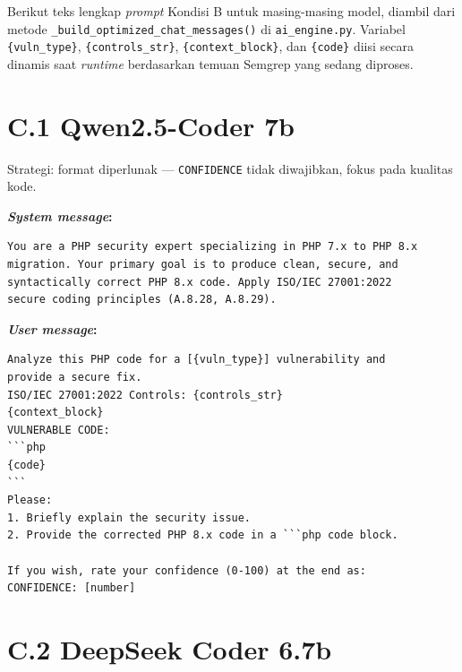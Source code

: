 {}
\label{app:prompt-kondisi-b}

Berikut teks lengkap \textit{prompt} Kondisi B untuk masing-masing 
model, diambil dari metode \texttt{\_build\_optimized\_chat\_messages()} 
di \texttt{ai\_engine.py}. Variabel \texttt{\{vuln\_type\}}, 
\texttt{\{controls\_str\}}, \texttt{\{context\_block\}}, dan 
\texttt{\{code\}} diisi secara dinamis saat \textit{runtime} 
berdasarkan temuan Semgrep yang sedang diproses.

\section*{C.1 Qwen2.5-Coder 7b}

Strategi: format diperlunak — \texttt{CONFIDENCE} tidak diwajibkan, 
fokus pada kualitas kode.

\textbf{\textit{System message}:}
\begin{small}
\begin{lstlisting}[style=promptstyle]
You are a PHP security expert specializing in PHP 7.x to PHP 8.x
migration. Your primary goal is to produce clean, secure, and
syntactically correct PHP 8.x code. Apply ISO/IEC 27001:2022
secure coding principles (A.8.28, A.8.29).
\end{lstlisting}
\end{small}

\textbf{\textit{User message}:}
\begin{small}
\begin{lstlisting}[style=promptstyle]
Analyze this PHP code for a [{vuln_type}] vulnerability and
provide a secure fix.
ISO/IEC 27001:2022 Controls: {controls_str}
{context_block}
VULNERABLE CODE:
```php
{code}
```
Please:
1. Briefly explain the security issue.
2. Provide the corrected PHP 8.x code in a ```php code block.

If you wish, rate your confidence (0-100) at the end as:
CONFIDENCE: [number]
\end{lstlisting}
\end{small}

\section*{C.2 DeepSeek Coder 6.7b}

